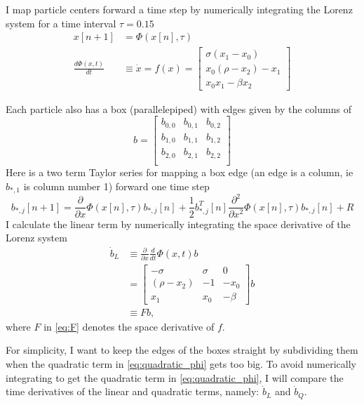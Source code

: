 \documentclass[12pt]{article}
\begin{document}
I map particle centers forward a time step by numerically integrating
the Lorenz system for a time interval $\tau = 0.15$
\begin{align}
  x[n+1] &= \Phi(x[n],\tau) \\
  \frac{d \Phi(x,t)}{dt} &\equiv \dot x = f(x) =
                           \begin{bmatrix}
                             \sigma(x_1-x_0)\\
                             x_0(\rho-x_2) - x_1\\
                             x_0x_1 - \beta x_2
                           \end{bmatrix}
\end{align}

Each particle also has a box (parallelepiped) with edges given by the
columns of
\begin{equation*}
  b =
  \begin{bmatrix}
    b_{0,0} & b_{0,1} & b_{0,2} \\
    b_{1,0} & b_{1,1} & b_{1,2} \\
    b_{2,0} & b_{2,1} & b_{2,2} \\
  \end{bmatrix}
\end{equation*}
%
Here is a two term Taylor series for mapping a box edge (an edge is a
column, ie $b_{*,1}$ is column number 1) forward one time step
\begin{equation}
  \label{eq:quadratic_phi}
  b_{*,j}[n+1] = \frac{\partial}{\partial x} \Phi(x[n], \tau) b_{*,j}[n] + \frac{1}{2} b_{*,j}^T[n]
  \frac{\partial^2}{\partial x^2} \Phi(x[n], \tau) b_{*,j}[n] + R
\end{equation}
I calculate the linear term by numerically integrating the space
derivative of the Lorenz system
\begin{align}
  \label{eq:tangent}
  \dot b_L &\equiv \frac{\partial}{\partial x} \frac{d}{dt} \Phi(x,t) b
  \\
  \nonumber 
  &=
    \begin{bmatrix}
      -\sigma & \sigma & 0 \\
      (\rho - x_2) & -1 & -x_0 \\
      x_1 & x_0 & -\beta
    \end{bmatrix} b  \\
  \label{eq:F}
  & \equiv F b,
\end{align}
where $F$ in \eqref{eq:F} denotes the space derivative of $f$.

For simplicity, I want to keep the edges of the boxes straight by
subdividing them when the quadratic term in \eqref{eq:quadratic_phi}
gets too big.  To avoid numerically integrating to get the quadratic
term in \eqref{eq:quadratic_phi}, I will compare the time derivatives
of the linear and quadratic terms, namely: $\dot b_L$ and $\dot b_Q$.
\end{document}

